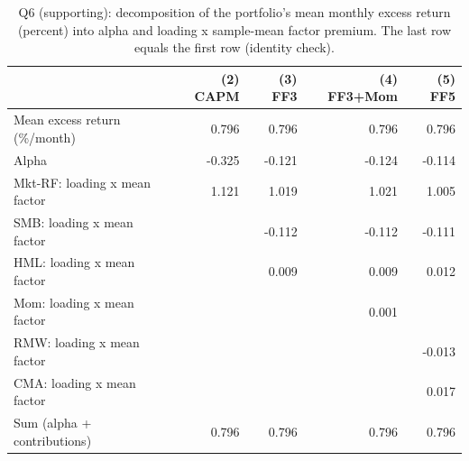 \begin{table}
\caption{Q6 (supporting): decomposition of the portfolio's mean monthly excess return (percent) into alpha and loading x sample-mean factor premium. The last row equals the first row (identity check).}
\label{tab:q6c}
\begin{tabular}{lrrrr}
\toprule
 & (2) CAPM & (3) FF3 & (4) FF3+Mom & (5) FF5 \\
\midrule
Mean excess return (\%/month) & 0.796 & 0.796 & 0.796 & 0.796 \\
Alpha & -0.325 & -0.121 & -0.124 & -0.114 \\
Mkt-RF: loading x mean factor & 1.121 & 1.019 & 1.021 & 1.005 \\
SMB: loading x mean factor &  & -0.112 & -0.112 & -0.111 \\
HML: loading x mean factor &  & 0.009 & 0.009 & 0.012 \\
Mom: loading x mean factor &  &  & 0.001 &  \\
RMW: loading x mean factor &  &  &  & -0.013 \\
CMA: loading x mean factor &  &  &  & 0.017 \\
Sum (alpha + contributions) & 0.796 & 0.796 & 0.796 & 0.796 \\
\bottomrule
\end{tabular}
\end{table}
